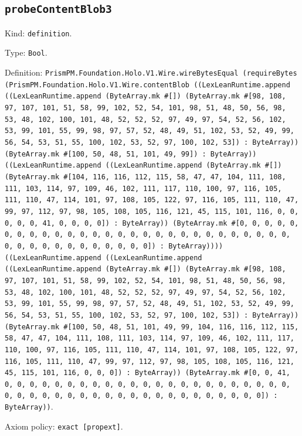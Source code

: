 \documentclass[11pt]{article}
\begin{document}
\subsection*{\texttt{probeContentBlob3}}
\noindent Kind: \texttt{definition}.\par
\noindent Type: \texttt{Bool}.\par
\noindent Definition: \texttt{PrismPM.Foundation.Holo.V1.Wire.wireBytesEqual (requireBytes (PrismPM.Foundation.Holo.V1.Wire.contentBlob ((LexLeanRuntime.append ((LexLeanRuntime.append (ByteArray.mk \#[]) (ByteArray.mk \#[98, 108, 97, 107, 101, 51, 58, 99, 102, 52, 54, 101, 98, 51, 48, 50, 56, 98, 53, 48, 102, 100, 101, 48, 52, 52, 52, 97, 49, 97, 54, 52, 56, 102, 53, 99, 101, 55, 99, 98, 97, 57, 52, 48, 49, 51, 102, 53, 52, 49, 99, 56, 54, 53, 51, 55, 100, 102, 53, 52, 97, 100, 102, 53]) : ByteArray)) (ByteArray.mk \#[100, 50, 48, 51, 101, 49, 99]) : ByteArray)) ((LexLeanRuntime.append ((LexLeanRuntime.append (ByteArray.mk \#[]) (ByteArray.mk \#[104, 116, 116, 112, 115, 58, 47, 47, 104, 111, 108, 111, 103, 114, 97, 109, 46, 102, 111, 117, 110, 100, 97, 116, 105, 111, 110, 47, 114, 101, 97, 108, 105, 122, 97, 116, 105, 111, 110, 47, 99, 97, 112, 97, 98, 105, 108, 105, 116, 121, 45, 115, 101, 116, 0, 0, 0, 0, 0, 41, 0, 0, 0, 0]) : ByteArray)) (ByteArray.mk \#[0, 0, 0, 0, 0, 0, 0, 0, 0, 0, 0, 0, 0, 0, 0, 0, 0, 0, 0, 0, 0, 0, 0, 0, 0, 0, 0, 0, 0, 0, 0, 0, 0, 0, 0, 0, 0, 0, 0, 0]) : ByteArray)))) ((LexLeanRuntime.append ((LexLeanRuntime.append ((LexLeanRuntime.append (ByteArray.mk \#[]) (ByteArray.mk \#[98, 108, 97, 107, 101, 51, 58, 99, 102, 52, 54, 101, 98, 51, 48, 50, 56, 98, 53, 48, 102, 100, 101, 48, 52, 52, 52, 97, 49, 97, 54, 52, 56, 102, 53, 99, 101, 55, 99, 98, 97, 57, 52, 48, 49, 51, 102, 53, 52, 49, 99, 56, 54, 53, 51, 55, 100, 102, 53, 52, 97, 100, 102, 53]) : ByteArray)) (ByteArray.mk \#[100, 50, 48, 51, 101, 49, 99, 104, 116, 116, 112, 115, 58, 47, 47, 104, 111, 108, 111, 103, 114, 97, 109, 46, 102, 111, 117, 110, 100, 97, 116, 105, 111, 110, 47, 114, 101, 97, 108, 105, 122, 97, 116, 105, 111, 110, 47, 99, 97, 112, 97, 98, 105, 108, 105, 116, 121, 45, 115, 101, 116, 0, 0, 0]) : ByteArray)) (ByteArray.mk \#[0, 0, 41, 0, 0, 0, 0, 0, 0, 0, 0, 0, 0, 0, 0, 0, 0, 0, 0, 0, 0, 0, 0, 0, 0, 0, 0, 0, 0, 0, 0, 0, 0, 0, 0, 0, 0, 0, 0, 0, 0, 0, 0, 0, 0, 0, 0]) : ByteArray))}.\par
\noindent Axiom policy: \texttt{exact [propext]}.\par
\end{document}
